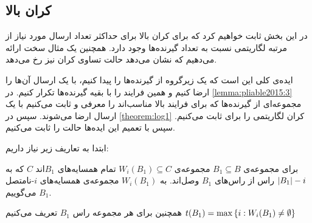 \subsection{کران بالا}
در این بخش ثابت خواهیم کرد که برای
\picodt
کران بالا برای حداکثر تعداد ارسال مورد نیاز از مرتبه لگاریتمی نسبت به تعداد گیرنده‌ها وجود دارد. همچنین یک مثال سخت ارائه می‌دهیم که نشان می‌دهد حالت تساوی کران نیز رخ می‌دهد.

ایده‌ی کلی این است که یک زیرگروه از گیرنده‌ها را پیدا کنیم، با یک ارسال آن‌ها را ارضا کنیم و همین فرایند را با بقیه گیرنده‌ها تکرار کنیم. در 
\autoref{lemma:pliable2015:3} 
مجموعه‌ای از گیرنده‌ها که برای فرایند بالا مناسب‌اند را معرفی و ثابت می‌کنیم با یک ارسال ارضا می‌شوند. سپس در 
\autoref{theorem:log1}
 کران لگاریتمی را برای
 ثابت می‌کنیم. سپس با تعمیم این ایده‌ها حالت
 را ثابت می‌کنیم.

ابتدا به تعاریف زیر نیاز داریم:
	\begin{definition}
	\label{def:nonnei}
	برای مجموعه‌ی
	$B_1 \subseteq B$
	مجموعه‌ی
	$W_i(B_1) \subseteq C$
	تمام همسایه‌های
	$B_1$اند 
	$C$
	 که به 
	$\left|{B_1}\right| - i$
	راس از راس‌های
	$B_1$
	وصل‌اند. به
	$W_i(B_1)$
	مجموعه‌ی همسایه‌های
	$i$-نامتصل 
	$B_1$
	می‌گوییم.
	
	همچنین برای هر مجموعه‌ راس
	$B_1$
	تعریف می‌کنیم 
	$t(B_1) = \max\left\{ i: W_i(B_1) \neq \emptyset  \right\}$
\end{definition}

